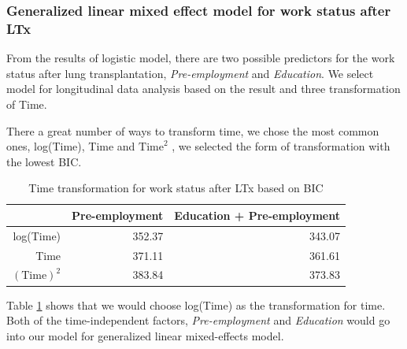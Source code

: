 \documentclass[11pt, a4paper]{article}\usepackage[]{graphicx}\usepackage[]{color}
\begin{document}
{%
\subsubsection*{Generalized linear mixed effect model for work status after LTx}\label{subsubsec:GLMM}
From the results of logistic model, there are two possible predictors for the work  status after lung transplantation, \textit{Pre-employment} and \textit{Education}. We select model for longitudinal data analysis based on the result and three transformation of Time.

There a great number of ways to transform time, we chose the most common ones, log(Time), Time and $\mathrm{Time}^2$ , we selected the form of transformation with the lowest BIC.




\begin{table}[ht]
\centering
\caption{Time transformation for work status after LTx based on BIC} 
\label{tab:tab30}
\begin{tabular}{rrr}
  \hline
 & Pre-employment & Education + Pre-employment \\ 
  \hline
log(Time) & 352.37 & 343.07 \\ 
  Time & 371.11 & 361.61 \\ 
  $(\mathrm{Time})^2$ & 383.84 & 373.83 \\ 
   \hline
\end{tabular}
\end{table}


Table \ref{tab:tab30} shows that we would choose log(Time) as the transformation for time. Both of the time-independent factors, \textit{Pre-employment} and \textit{Education} would go into our model for generalized linear mixed-effects model. 

\begin{table}[ht]
\centering
\caption{Model selection for work status based on Time-dependent factors} 
\end{table}



}
\end{document}
